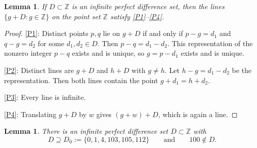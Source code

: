 \documentclass[11pt]{article}
\newtheorem{lemma}[theorem]{Lemma}
\theoremstyle{definition}
\theoremstyle{remark}
\newcommand{\Z}{\mathbb{Z}}
\begin{document}
\begin{lemma}\label{lem:plane}
If $D\subset\Z$ is an infinite perfect difference set, then the lines $\{g+D:g\in\Z\}$ on the point set $\Z$ satisfy \ref{P1}--\ref{P4}.
\end{lemma}

\begin{proof}
\ref{P1}: Distinct points $p,q$ lie on $g+D$ if and only if $p-g=d_1$ and $q-g=d_2$ for some $d_1,d_2\in D$. Then $p-q=d_1-d_2$. This representation of the nonzero integer $p-q$ exists and is unique, so $g=p-d_1$ exists and is unique.

\ref{P2}: Distinct lines are $g+D$ and $h+D$ with $g\neq h$. Let $h-g=d_1-d_2$ be the representation. Then both lines contain the point $g+d_1=h+d_2$.

\ref{P3}: Every line is infinite.

\ref{P4}: Translating $g+D$ by $w$ gives $(g+w)+D$, which is again a line.
\end{proof}

\begin{lemma}\label{lem:diffset}
There is an infinite perfect difference set $D\subset\Z$ with
\[
D\supseteq D_0:=\{0,1,4,103,105,112\}\qquad\text{and}\qquad 100\notin D.
\]
\end{lemma}
\end{document}
